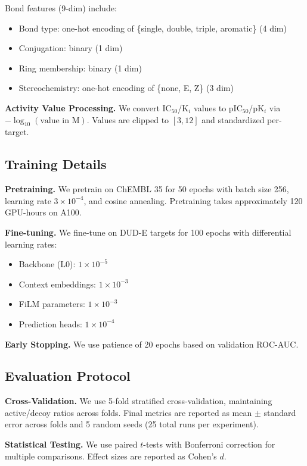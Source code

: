 \documentclass[runningheads]{llncs}
\begin{document}
Bond features (9-dim) include:
\begin{itemize}[noitemsep]
    \item Bond type: one-hot encoding of \{single, double, triple, aromatic\} (4 dim)
    \item Conjugation: binary (1 dim)
    \item Ring membership: binary (1 dim)
    \item Stereochemistry: one-hot encoding of \{none, E, Z\} (3 dim)
\end{itemize}

\textbf{Activity Value Processing.} We convert IC$_{50}$/K$_i$ values to pIC$_{50}$/pK$_i$ via $-\log_{10}(\text{value in M})$. Values are clipped to $[3, 12]$ and standardized per-target.

\subsection{Training Details}

\textbf{Pretraining.} We pretrain on ChEMBL 35 for 50 epochs with batch size 256, learning rate $3 \times 10^{-4}$, and cosine annealing. Pretraining takes approximately 120 GPU-hours on A100.

\textbf{Fine-tuning.} We fine-tune on DUD-E targets for 100 epochs with differential learning rates:
\begin{itemize}[noitemsep]
    \item Backbone (L0): $1 \times 10^{-5}$
    \item Context embeddings: $1 \times 10^{-3}$
    \item FiLM parameters: $1 \times 10^{-3}$
    \item Prediction heads: $1 \times 10^{-4}$
\end{itemize}

\textbf{Early Stopping.} We use patience of 20 epochs based on validation ROC-AUC.

\subsection{Evaluation Protocol}

\textbf{Cross-Validation.} We use 5-fold stratified cross-validation, maintaining active/decoy ratios across folds. Final metrics are reported as mean $\pm$ standard error across folds and 5 random seeds (25 total runs per experiment).

\textbf{Statistical Testing.} We use paired $t$-tests with Bonferroni correction for multiple comparisons. Effect sizes are reported as Cohen's $d$.
\end{document}
